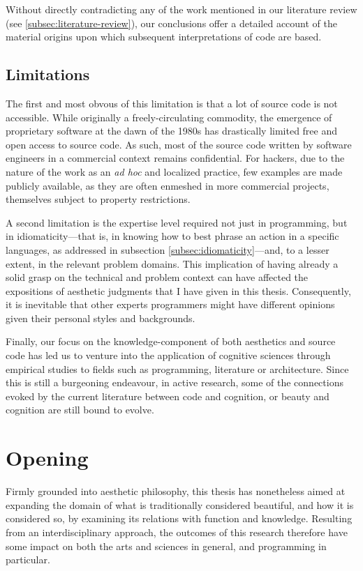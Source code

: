 Without directly contradicting any of the work mentioned in our literature review (see \ref{subsec:literature-review}), our conclusions offer a detailed account of the material origins upon which subsequent interpretations of code are based.

\subsection{Limitations}
\label{subsec:conclusion-limitations}

The first and most obvous of this limitation is that a lot of source code is not accessible. While originally a freely-circulating commodity, the emergence of proprietary software at the dawn of the 1980s \citep{hassett_impact_2012} has drastically limited free and open access to source code. As such, most of the source code written by software engineers in a commercial context remains confidential. For hackers, due to the nature of the work as an \emph{ad hoc} and localized practice, few examples are made publicly available, as they are often enmeshed in more commercial projects, themselves subject to property restrictions.


A second limitation is the expertise level required not just in programming, but in idiomaticity—that is, in knowing how to best phrase an action in a specific languages, as addressed in subsection \ref{subsec:idiomaticity}—and, to a lesser extent, in the relevant problem domains. This implication of having already a solid grasp on the technical and problem context can have affected the expositions of aesthetic judgments that I have given in this thesis. Consequently, it is inevitable that other experts programmers might have different opinions given their personal styles and backgrounds.

Finally, our focus on the knowledge-component of both aesthetics and source code has led us to venture into the application of cognitive sciences through empirical studies to fields such as programming, literature or architecture. Since this is still a burgeoning endeavour, in active research,  some of the connections evoked by the current literature between code and cognition, or beauty and cognition are still bound to evolve.

\section{Opening}
\label{sec:openting}

Firmly grounded into aesthetic philosophy, this thesis has nonetheless aimed at expanding the domain of what is traditionally considered beautiful, and how it is considered so, by examining its relations with function and knowledge. Resulting from an interdisciplinary approach, the outcomes of this research therefore have some impact  on both the arts and sciences in general, and programming in particular.

